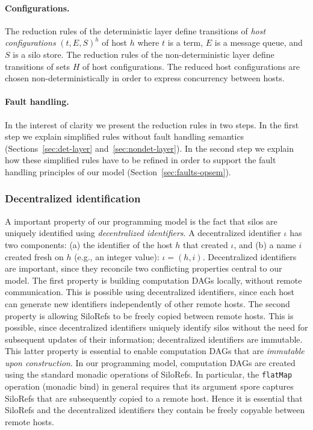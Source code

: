 \documentclass[preprint]{sigplanconf}
\theoremstyle{definition}
\theoremstyle{definition}
\begin{document}
\paragraph{Configurations.} The reduction rules of the deterministic layer define transitions of \emph{host configurations} $(t, E, S)^h$ of host $h$ where $t$ is a term, $E$ is a message queue, and $S$ is a silo store. The reduction rules of the non-deterministic layer define transitions of sets $H$ of host configurations. The reduced host configurations are chosen non-deterministically in order to express concurrency between hosts.

\paragraph{Fault handling.} In the interest of clarity we present the reduction rules in two steps. In the first step we explain simplified rules without fault handling semantics (Sections~\ref{sec:det-layer} and~\ref{sec:nondet-layer}). In the second step we explain how these simplified rules have to be refined in order to support the fault handling principles of our model (Section~\ref{sec:faults-opsem}).



\subsubsection{Decentralized identification}

A important property of our programming model is the fact that silos are uniquely identified using \emph{decentralized identifiers}. A decentralized identifier $\iota$ has two components: (a) the identifier of the host $h$ that created $\iota$, and (b) a name $i$ created fresh on $h$ (e.g., an integer value): $\iota = (h, i)$. Decentralized identifiers are important, since they reconcile two conflicting properties central to our model. The first property is building computation DAGs locally, without remote communication. This is possible using decentralized identifiers, since each host can generate new identifiers independently of other remote hosts. The second property is allowing SiloRefs to be freely copied between remote hosts. This is possible, since decentralized identifiers uniquely identify silos without the need for subsequent updates of their information; decentralized identifiers are immutable. This latter property is essential to enable computation DAGs that are \emph{immutable upon construction}. In our programming model, computation DAGs are created using the standard monadic operations of SiloRefs. In particular, the \texttt{flatMap} operation (monadic bind) in general requires that its argument spore captures SiloRefs that are subsequently copied to a remote host. Hence it is essential that SiloRefs and the decentralized identifiers they contain be freely copyable between remote hosts.
\end{document}
